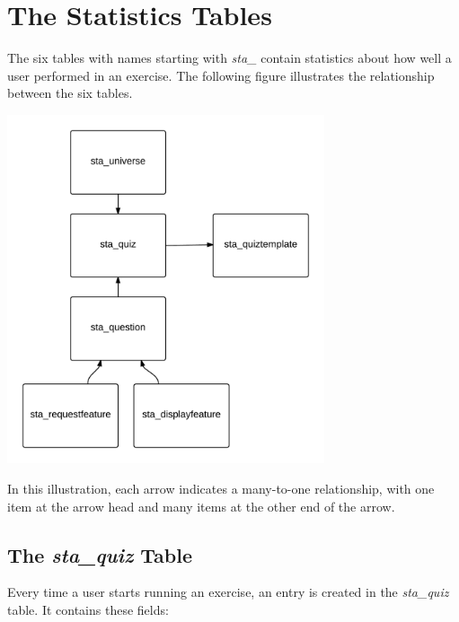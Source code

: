 \documentclass[11pt,oneside,a4paper]{memoir}
\begin{document}
\section{The Statistics Tables}\label{sec-statistics-tables}

The six tables with names starting with \emph{sta\_} contain statistics about how well a user performed
in an exercise. The following figure illustrates the relationship between the six tables.

\begin{center}
\includegraphics[width=0.7\textwidth]{sta_tables.png}
\end{center}

In this illustration, each arrow indicates a many-to-one relationship, with one item at the arrow
head and many items at the other end of the arrow.


\subsection{The \emph{sta\_quiz} Table}\label{sec-staquiz}

Every time a user starts running an exercise, an entry is created in the \emph{sta\_quiz} table. It
contains these fields:
\end{document}
